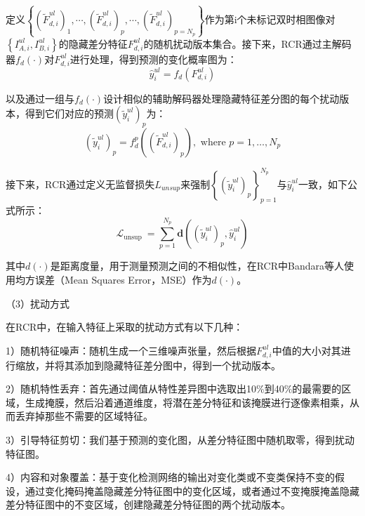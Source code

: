 \documentclass[lang=chs, degree=master, blindreview=false, adobe=false]{yanputhesis}
\begin{document}
定义$\left\{\left(\widetilde{F}_{d, i}^{u l}\right)_{1}, \cdots,\left(\widetilde{F}_{d, i}^{u l}\right)_{p}, \cdots,\left(\widetilde{F}_{d, i}^{u l}\right)_{p=N_{p}}\right\}$作为第i个未标记双时相图像对$\left\{I_{A, i}^{ul}, I_{B, i}^{ul}\right\}$的隐藏差分特征$F_{d, i}^{u l}$的随机扰动版本集合。接下来，RCR通过主解码器$f_d(\cdot)$对$F_{d, i}^{u l}$进行处理，得到预测的变化概率图为：
\begin{equation}
  \label{eq:RCRpredict}
  \hat{y}_{i}^{u l}=f_{d}\left(F_{d, i}^{u l}\right)
\end{equation}

以及通过一组与$f_d(\cdot)$设计相似的辅助解码器处理隐藏特征差分图的每个扰动版本，得到它们对应的预测$\left(\widetilde{y}_{i}^{u l}\right)_{p}$为：
\begin{equation}
  \label{eq:RCRauxpredict}
  \left(\widetilde{y}_{i}^{u l}\right)_{p}=f_{d}^{p}\left(\left(\widetilde{F}_{d, i}^{u l}\right)_{p}\right), \text { where } p=1, \ldots, N_{p}
\end{equation}

接下来，RCR通过定义无监督损失$L_{unsup}$来强制$\left\{\left(\widetilde{y}_{i}^{u l}\right)_{p}\right\}_{p=1}^{N_{p}}$与$\hat{y}_{i}^{u l}$一致，如下公式所示：
\begin{equation}
  \label{eq:RCRLossu}
  \mathcal{L}_{\text {unsup }}=\sum_{p=1}^{N_{p}} \mathbf{d}\left(\left(\widetilde{y}_{i}^{u l}\right)_{p}, \hat{y}_{i}^{u l}\right)
\end{equation}

其中$d(\cdot)$是距离度量，用于测量预测之间的不相似性，在RCR中Bandara等人使用均方误差（Mean Squares Error，MSE）作为$d(\cdot)$。

（3）扰动方式

在RCR中，在输入特征上采取的扰动方式有以下几种：

1）随机特征噪声：随机生成一个三维噪声张量，然后根据$F_{d, i}^{u l}$中值的大小对其进行缩放，并将其添加到隐藏特征差分图中，得到一个扰动版本。

2）随机特性丢弃：首先通过阈值从特性差异图中选取出10$\%$到40$\%$的最需要的区域，生成掩膜，然后沿着通道维度，将潜在差分特征和该掩膜进行逐像素相乘，从而丢弃掉那些不需要的区域特征。

3）引导特征剪切：我们基于预测的变化图，从差分特征图中随机取零，得到扰动特征图。

4）内容和对象覆盖：基于变化检测网络的输出对变化类或不变类保持不变的假设，通过变化掩码掩盖隐藏差分特征图中的变化区域，或者通过不变掩膜掩盖隐藏差分特征图中的不变区域，创建隐藏差分特征图的两个扰动版本。
\end{document}
